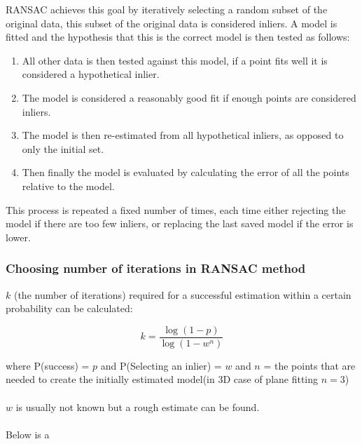 			RANSAC achieves this goal by iteratively selecting a random subset of the original data, this subset of the original data is considered inliers. A model is fitted and the hypothesis that this is the correct model is then tested as follows:
			
			\begin{enumerate}
				\item All other data is then tested against this model, if a point fits well it is considered a hypothetical inlier.
				
				\item The model is considered a reasonably good fit if enough points are considered inliers.
				
				\item The model is then re-estimated from all hypothetical inliers, as opposed to only the initial set.
				
				\item Then finally the model is evaluated by calculating the error of all the points relative to the model.
			\end{enumerate}
			
			This process is repeated a fixed number of times, each time either rejecting the model if there are too few inliers, or replacing the last saved model if the error is lower.
			\subsubsection{Choosing number of iterations in RANSAC method}
			$k$ (the number of iterations) required for a successful estimation within a certain probability can be calculated:
			
			\begin{equation}
				k = \frac{\log(1-p)}{\log(1- w^n)}
			\end{equation}
			
			where P(success) = $p$ and P(Selecting an inlier) = $w$ and $n$ = the points that are needed to create the initially estimated model(in 3D case of plane fitting $n = 3$)\\
			\\
			$w$ is usually not known but a rough estimate can be found.\\
			\\
			
			Below is a 
		
